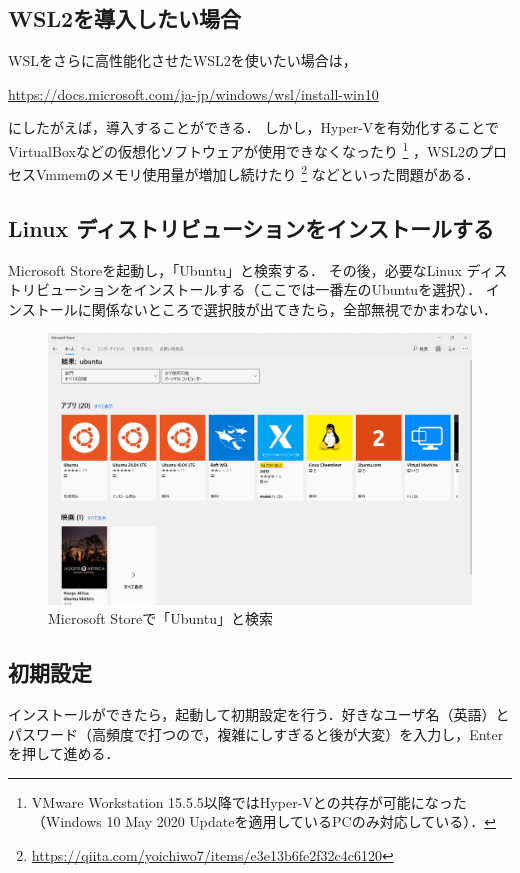 \documentclass[uplatex]{jsarticle}
\begin{document}
\subsection{WSL2を導入したい場合}
WSLをさらに高性能化させたWSL2を使いたい場合は，
\begin{center}
\url{https://docs.microsoft.com/ja-jp/windows/wsl/install-win10}
\end{center}
\noindent
にしたがえば，導入することができる．
しかし，Hyper-Vを有効化することでVirtualBoxなどの仮想化ソフトウェアが使用できなくなったり
\footnote{VMware Workstation 15.5.5以降ではHyper-Vとの共存が可能になった（Windows 10 May 2020 Updateを適用しているPCのみ対応している）．}
，WSL2のプロセスVmmemのメモリ使用量が増加し続けたり
\footnote{\url{https://qiita.com/yoichiwo7/items/e3e13b6fe2f32c4c6120}}
などといった問題がある．

\subsection{Linux ディストリビューションをインストールする}
Microsoft Storeを起動し，「Ubuntu」と検索する．
その後，必要なLinux ディストリビューションをインストールする（ここでは一番左のUbuntuを選択）．
インストールに関係ないところで選択肢が出てきたら，全部無視でかまわない．

\begin{figure}[h]
\centering
\includegraphics[scale=0.25]{./図/search_ubuntu.png}
\caption{Microsoft Storeで「Ubuntu」と検索}
\end{figure}

\subsection{初期設定}
インストールができたら，起動して初期設定を行う．好きなユーザ名（英語）とパスワード（高頻度で打つので，複雑にしすぎると後が大変）を入力し，Enterを押して進める．
\end{document}
